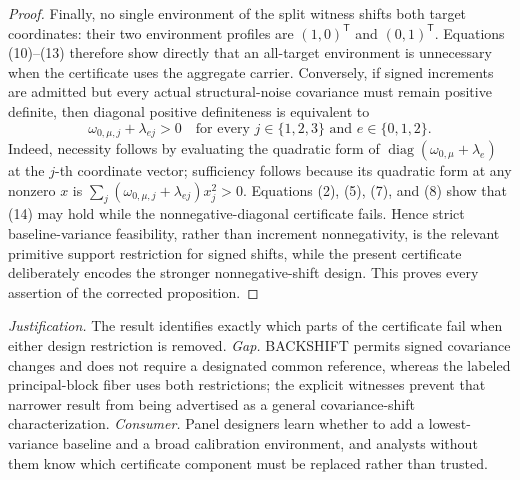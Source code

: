 \documentclass{article}
\begin{document}
\begin{proof}
Finally, no single environment of the split witness shifts both target coordinates: their two environment profiles are \((1,0)^{\mathsf T}\) and \((0,1)^{\mathsf T}\).  Equations (10)--(13) therefore show directly that an all-target environment is unnecessary when the certificate uses the aggregate carrier.  Conversely, if signed increments are admitted but every actual structural-noise covariance must remain positive definite, then diagonal positive definiteness is equivalent to
\[
 \omega_{0,\mu,j}+\lambda_{ej}>0
 \quad\text{for every }j\in\{1,2,3\}\text{ and }e\in\{0,1,2\}. \tag{14}
\]
Indeed, necessity follows by evaluating the quadratic form of \(\operatorname{diag}(\omega_{0,\mu}+\lambda_e)\) at the \(j\)-th coordinate vector; sufficiency follows because its quadratic form at any nonzero \(x\) is \(\sum_j(\omega_{0,\mu,j}+\lambda_{ej})x_j^2>0\).  Equations (2), (5), (7), and (8) show that (14) may hold while the nonnegative-diagonal certificate fails.  Hence strict baseline-variance feasibility, rather than increment nonnegativity, is the relevant primitive support restriction for signed shifts, while the present certificate deliberately encodes the stronger nonnegative-shift design.  This proves every assertion of the corrected proposition.
\end{proof}
\par\smallskip\noindent \textit{Justification.} The result identifies exactly which parts of the certificate fail when either design restriction is removed. \textit{Gap.} BACKSHIFT permits signed covariance changes and does not require a designated common reference, whereas the labeled principal-block fiber uses both restrictions; the explicit witnesses prevent that narrower result from being advertised as a general covariance-shift characterization. \textit{Consumer.} Panel designers learn whether to add a lowest-variance baseline and a broad calibration environment, and analysts without them know which certificate component must be replaced rather than trusted.
\end{document}
